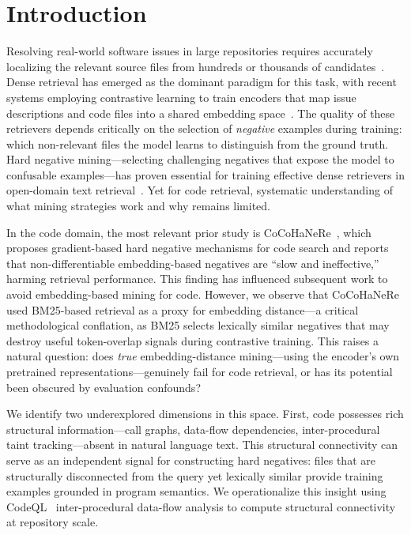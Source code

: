 \section{Introduction}
\label{sec:intro}

Resolving real-world software issues in large repositories requires accurately localizing the relevant source files from hundreds or thousands of candidates~\cite{jimenez2024swebench}.
Dense retrieval has emerged as the dominant paradigm for this task, with recent systems employing contrastive learning to train encoders that map issue descriptions and code files into a shared embedding space~\cite{reddy2025swerank,xie2025swefixer}.
The quality of these retrievers depends critically on the selection of \emph{negative} examples during training: which non-relevant files the model learns to distinguish from the ground truth.
Hard negative mining---selecting challenging negatives that expose the model to confusable examples---has proven essential for training effective dense retrievers in open-domain text retrieval~\cite{karpukhin2020dpr,xiong2021ance,zhan2021star}.
Yet for code retrieval, systematic understanding of what mining strategies work and why remains limited.

In the code domain, the most relevant prior study is CoCoHaNeRe~\cite{fan2025cocohanere}, which proposes gradient-based hard negative mechanisms for code search and reports that non-differentiable embedding-based negatives are ``slow and ineffective,'' harming retrieval performance.
This finding has influenced subsequent work to avoid embedding-based mining for code.
However, we observe that CoCoHaNeRe used BM25-based retrieval as a proxy for embedding distance---a critical methodological conflation, as BM25 selects lexically similar negatives that may destroy useful token-overlap signals during contrastive training.
This raises a natural question: does \emph{true} embedding-distance mining---using the encoder's own pretrained representations---genuinely fail for code retrieval, or has its potential been obscured by evaluation confounds?

We identify two underexplored dimensions in this space.
First, code possesses rich structural information---call graphs, data-flow dependencies, inter-procedural taint tracking---absent in natural language text.
This structural connectivity can serve as an independent signal for constructing hard negatives: files that are structurally disconnected from the query yet lexically similar provide training examples grounded in program semantics.
We operationalize this insight using CodeQL~\cite{avgustinov2016ql} inter-procedural data-flow analysis to compute structural connectivity at repository scale.

